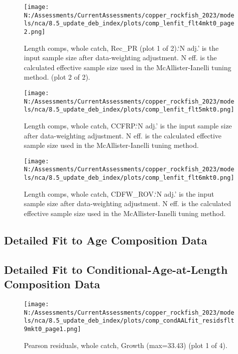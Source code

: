 \documentclass[11pt,
  english,
  letterpaper,
]{article}
\begin{document}
\begin{figure}
\centering
\texttt{[image: N:/Assessments/CurrentAssessments/copper\_rockfish\_2023/models/nca/8.5\_update\_deb\_index/plots/comp\_lenfit\_flt4mkt0\_page2.png]}
\caption{Length comps, whole catch, Rec\_PR (plot 1 of 2).`N adj.' is the input sample size after data-weighting adjustment. N eff. is the calculated effective sample size used in the McAllister-Ianelli tuning method. (plot 2 of 2).\label{fig:comp_lenfit_flt4mkt0_page2}}
\end{figure}

\begin{figure}
\centering
\texttt{[image: N:/Assessments/CurrentAssessments/copper\_rockfish\_2023/models/nca/8.5\_update\_deb\_index/plots/comp\_lenfit\_flt5mkt0.png]}
\caption{Length comps, whole catch, CCFRP.`N adj.' is the input sample size after data-weighting adjustment. N eff. is the calculated effective sample size used in the McAllister-Ianelli tuning method.\label{fig:comp_lenfit_flt5mkt0}}
\end{figure}

\begin{figure}
\centering
\texttt{[image: N:/Assessments/CurrentAssessments/copper\_rockfish\_2023/models/nca/8.5\_update\_deb\_index/plots/comp\_lenfit\_flt6mkt0.png]}
\caption{Length comps, whole catch, CDFW\_ROV.`N adj.' is the input sample size after data-weighting adjustment. N eff. is the calculated effective sample size used in the McAllister-Ianelli tuning method.\label{fig:comp_lenfit_flt6mkt0}}
\end{figure}

\newpage

\hypertarget{age-data}{%
\subsection{Detailed Fit to Age Composition Data}\label{age-data}}

\newpage

\hypertarget{caal-data}{%
\subsection{Detailed Fit to Conditional-Age-at-Length Composition Data}\label{caal-data}}

\begin{figure}
\centering
\texttt{[image: N:/Assessments/CurrentAssessments/copper\_rockfish\_2023/models/nca/8.5\_update\_deb\_index/plots/comp\_condAALfit\_residsflt9mkt0\_page1.png]}
\caption{Pearson residuals, whole catch, Growth (max=33.43) (plot 1 of 4).\label{fig:comp_condAALfit_residsflt9mkt0_page1}}
\end{figure}
\end{document}
